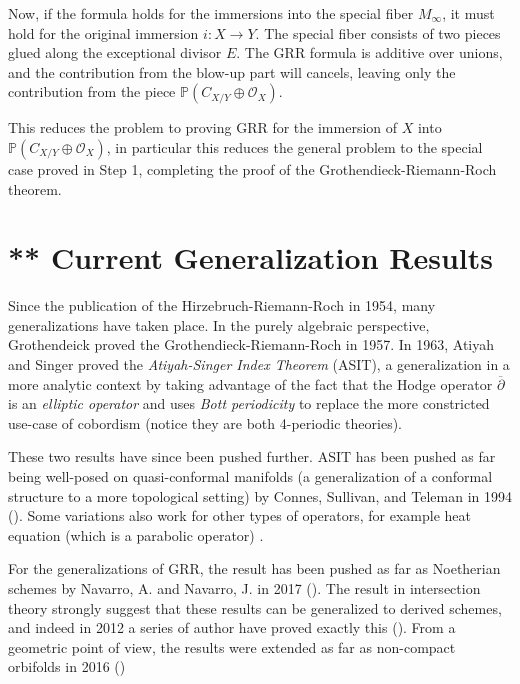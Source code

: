 \documentclass{ut-thesis}
\newenvironment{Proof}[1][]
  {\begin{ProofTcb}[#1]}
  {\end{ProofTcb}}
\renewcommand{\P}{{\mathbb{P}}}
\newcommand{\CO}{{\mathcal{O}}}
\begin{document}
\begin{Proof}
  Now, if the formula holds for the immersions into the special fiber $M_\infty$, it must hold for the original
  immersion $i: X \to Y$. The special fiber consists of two pieces glued along the exceptional divisor $E$. The
  GRR formula is additive over unions, and the contribution from the blow-up part will cancels, leaving only the
  contribution from the piece $\P(C_{X/Y} \oplus \CO_X)$.

  This reduces the problem to proving GRR for the immersion of $X$ into $\P(C_{X/Y} \oplus \CO_X)$, in
  particular this reduces the general problem to the special case proved in Step 1, completing the
  proof of the Grothendieck-Riemann-Roch theorem.
\end{Proof}


\section{** Current Generalization Results}\label{sec:DRR}

Since the publication of the Hirzebruch-Riemann-Roch in 1954, many generalizations have taken place. In the
purely algebraic perspective, Grothendeick proved the Grothendieck-Riemann-Roch in 1957. In 1963, Atiyah and
Singer proved the \emph{Atiyah-Singer Index Theorem} (ASIT), a generalization in a more analytic context by taking
advantage of the fact that the Hodge operator $\overline{\partial}$ is an \emph{elliptic operator} and uses
\emph{Bott periodicity} to replace the more constricted use-case of cobordism (notice they are both
4-periodic theories).

These two results have since been pushed further. ASIT has been pushed as far being well-posed on
quasi-conformal manifolds (a generalization of a conformal structure to a more topological setting) by
Connes, Sullivan, and Teleman in 1994 (\cite{connesQuasiconformalMappingsOperators1994}). Some variations
also work for other types of operators, for example heat equation (which is a parabolic operator)
\cite{gilkeyInvarianceTheoryHeat2018}.

For the generalizations of GRR, the result has been pushed as far as Noetherian schemes by Navarro, A. and
Navarro, J. in 2017 (\cite{navarroRiemannRochFormulaProjective2017}). The result in intersection theory
strongly suggest that these results can be generalized to derived schemes, and indeed in 2012 a series of
author have proved exactly this (\cite{lowreyGrothendieckRiemannRochDerivedSchemes2012}). From a geometric
point of view, the results were extended as far as non-compact orbifolds in 2016
(\cite{montpletRiemannRochIsometriesNoncompact2016})
\end{document}
